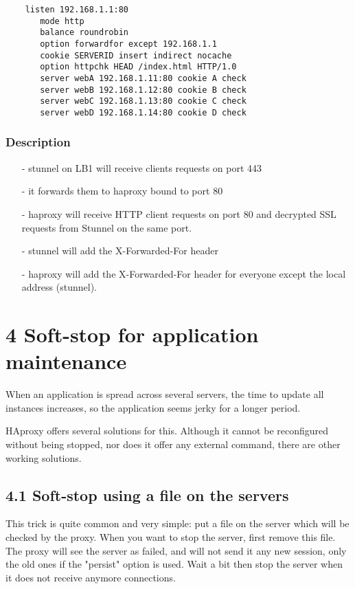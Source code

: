 \begin{verbatim}
    listen 192.168.1.1:80
       mode http
       balance roundrobin
       option forwardfor except 192.168.1.1
       cookie SERVERID insert indirect nocache
       option httpchk HEAD /index.html HTTP/1.0
       server webA 192.168.1.11:80 cookie A check
       server webB 192.168.1.12:80 cookie B check
       server webC 192.168.1.13:80 cookie C check
       server webD 192.168.1.14:80 cookie D check
\end{verbatim}

\subsubsection{Description}

\begin{itemize}
\item[-] stunnel on LB1 will receive clients requests on port 443
\item[-] it forwards them to haproxy bound to port 80
\item[-] haproxy will receive HTTP client requests on port 80 and decrypted SSL
   requests from Stunnel on the same port.
\item[-] stunnel will add the X-Forwarded-For header
\item[-] haproxy will add the X-Forwarded-For header for everyone except the local
   address (stunnel).
\end{itemize}

\section{4 Soft-stop for application maintenance}

When an application is spread across several servers, the time to update all
instances increases, so the application seems jerky for a longer period.

HAproxy offers several solutions for this. Although it cannot be reconfigured
without being stopped, nor does it offer any external command, there are other
working solutions.

\subsection{4.1 Soft-stop using a file on the servers}

This trick is quite common and very simple: put a file on the server which will
be checked by the proxy. When you want to stop the server, first remove this
file. The proxy will see the server as failed, and will not send it any new
session, only the old ones if the "persist" option is used. Wait a bit then
stop the server when it does not receive anymore connections.

